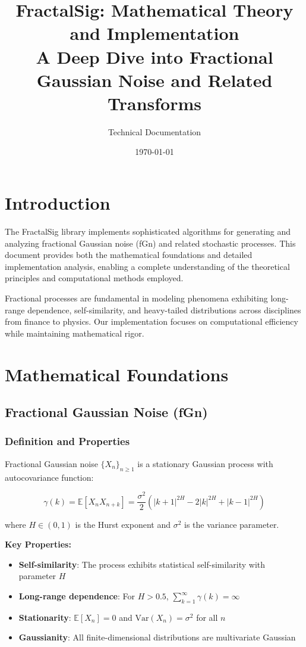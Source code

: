 \documentclass[11pt,a4paper]{article}
\title{FractalSig: Mathematical Theory and Implementation\\
\large A Deep Dive into Fractional Gaussian Noise and Related Transforms}
\author{Technical Documentation}
\date{\today}
\begin{document}
\maketitle

\tableofcontents
\newpage

\section{Introduction}

The FractalSig library implements sophisticated algorithms for generating and analyzing fractional Gaussian noise (fGn) and related stochastic processes. This document provides both the mathematical foundations and detailed implementation analysis, enabling a complete understanding of the theoretical principles and computational methods employed.

Fractional processes are fundamental in modeling phenomena exhibiting long-range dependence, self-similarity, and heavy-tailed distributions across disciplines from finance to physics. Our implementation focuses on computational efficiency while maintaining mathematical rigor.

\section{Mathematical Foundations}

\subsection{Fractional Gaussian Noise (fGn)}

\subsubsection{Definition and Properties}

Fractional Gaussian noise $\{X_n\}_{n \geq 1}$ is a stationary Gaussian process with autocovariance function:

\begin{equation}
\gamma(k) = \mathbb{E}[X_n X_{n+k}] = \frac{\sigma^2}{2}\left(|k+1|^{2H} - 2|k|^{2H} + |k-1|^{2H}\right)
\end{equation}

where $H \in (0,1)$ is the Hurst exponent and $\sigma^2$ is the variance parameter.

\textbf{Key Properties:}
\begin{itemize}
    \item \textbf{Self-similarity}: The process exhibits statistical self-similarity with parameter $H$
    \item \textbf{Long-range dependence}: For $H > 0.5$, $\sum_{k=1}^{\infty} \gamma(k) = \infty$
    \item \textbf{Stationarity}: $\mathbb{E}[X_n] = 0$ and $\text{Var}(X_n) = \sigma^2$ for all $n$
    \item \textbf{Gaussianity}: All finite-dimensional distributions are multivariate Gaussian
\end{itemize}
\end{document}
